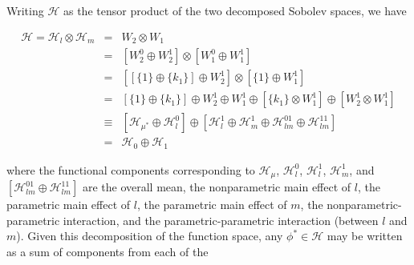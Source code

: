 \documentclass[12pt]{article}
\theoremstyle{definition}
\begin{document}
\noindent
Writing $\mathcal{H}$ as the tensor product of the two decomposed Sobolev spaces, we have

\begin{eqnarray}
\mathcal{H} = \mathcal{H}_l  \otimes \mathcal{H}_m &=& W_2 \otimes W_1 \label{eq:HilbertDecomp} \\ 
&=& \left[ W_2^0 \oplus W_2^1 \right] \otimes \left[ W_1^0 \oplus W_1^1 \right] \nonumber \\ 
&=& \left[ \left[ \lbrace 1 \rbrace \oplus \lbrace k_1 \rbrace \right] \oplus W_2^1 \right] \otimes \left[ \lbrace 1 \rbrace \oplus W_1^1 \right] \nonumber \\ 
&=&\left[ \lbrace 1 \rbrace  \oplus \lbrace k_1 \rbrace \right] \oplus W_2^1 \oplus W_1^1 \oplus  \left[ \lbrace k_1 \rbrace  \otimes  W_1^1 \right]  \oplus  \left[W_2^1 \otimes  W_1^1   \right] \nonumber \\
&\equiv& \left[ \mathcal{H}_{\mu^*} \oplus \mathcal{H}_l^0 \right] \oplus \left[ \mathcal{H}_l^1 \oplus \mathcal{H}_m^1 \oplus \mathcal{H}_{lm}^{01} \oplus \mathcal{H}_{lm}^{11}\right]
\nonumber\\
&=& \mathcal{H}_0 \oplus \mathcal{H}_1
\nonumber
\end{eqnarray} 

\noindent
where the functional components corresponding to $\mathcal{H}_\mu$, $\mathcal{H}_l^0$, $\mathcal{H}_l^1$, $\mathcal{H}_m^1$, and $\left[ \mathcal{H}_{lm}^{01} \oplus \mathcal{H}_{lm}^{11}\right]$ are the overall mean, the nonparametric main effect of $l$, the parametric main effect of $l$, the parametric main effect of $m$, the nonparametric-parametric interaction, and the parametric-parametric interaction (between $l$ and $m$). Given this decomposition of the function space, any $\phi^* \in \mathcal{H}$ may be written as a sum of components from each of the 
\end{document}
